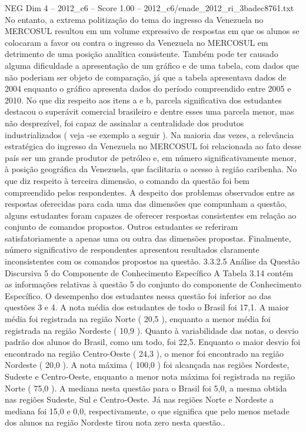 \begin{textsample}{NEG Dim 4 – 2012\_c6 – Score 1.00 – 2012\_c6/enade\_2012\_ri\_3badec8761.txt}
No entanto, a extrema politização do tema do ingresso da Venezuela no MERCOSUL resultou em um volume expressivo de respostas em que os alunos se colocaram a favor ou contra o ingresso da Venezuela no MERCOSUL em detrimento de uma posição analítica consistente.
Também pode ter causado alguma dificuldade a apresentação de um gráfico e de uma tabela, com dados que não poderiam ser objeto de comparação, já que a tabela apresentava dados de 2004 enquanto o gráfico apresenta dados do período compreendido entre 2005 e 2010.
No que diz respeito aos itens a e b, parcela significativa dos estudantes destacou o superávit comercial brasileiro e dentre esses uma parcela menor, mas não desprezível, foi capaz de assinalar a centralidade dos produtos industrializados ( veja -se exemplo a seguir ).
Na maioria das vezes, a relevância estratégica do ingresso da Venezuela no MERCOSUL foi relacionada ao fato desse país ser um grande produtor de petróleo e, em número significativamente menor, à posição geográfica da Venezuela, que facilitaria o acesso à região caribenha.
No que diz respeito à terceira dimensão, o comando da questão foi bem compreendido pelos respondentes.
A despeito dos problemas observados entre as respostas oferecidas para cada uma das dimensões que compunham a questão, alguns estudantes foram capazes de oferecer respostas consistentes em relação ao conjunto de comandos propostos.
Outros estudantes se referiram satisfatoriamente a apenas uma ou outra das dimensões propostas.
Finalmente, número significativo de respondentes apresentou resultados claramente inconsistentes com os comandos propostos na questão. 3.3.2.5 Análise da Questão Discursiva 5 do Componente de Conhecimento Específico A Tabela 3.14 contém as informações relativas à questão 5 do conjunto do componente de Conhecimento Específico.
O desempenho dos estudantes nessa questão foi inferior ao das questões 3 e 4.
A nota média dos estudantes de todo o Brasil foi 17,1.
A maior média foi registrada na região Norte ( 20,5 ), enquanto a menor média foi registrada na região Nordeste ( 10,9 ).
Quanto à variabilidade das notas, o desvio padrão dos alunos do Brasil, como um todo, foi 22,5.
Enquanto o maior desvio foi encontrado na região Centro-Oeste ( 24,3 ), o menor foi encontrado na região Nordeste ( 20,0 ).
A nota máxima ( 100,0 ) foi alcançada nas regiões Nordeste, Sudeste e Centro-Oeste, enquanto a menor nota máxima foi registrada na região Norte ( 75,0 ).
A mediana nesta questão para o Brasil foi 5,0, a mesma obtida nas regiões Sudeste, Sul e Centro-Oeste.
Já nas regiões Norte e Nordeste a mediana foi 15,0 e 0,0, respectivamente, o que significa que pelo menos metade dos alunos na região Nordeste tirou nota zero nesta questão..

\end{textsample}
